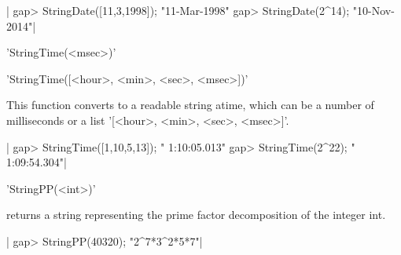 |   gap> StringDate([11,3,1998]);
   "11-Mar-1998"
   gap> StringDate(2^14);
   "10-Nov-2014"|

%

'StringTime(<msec>)'

'StringTime([<hour>, <min>, <sec>, <msec>])'

This function converts to a readable string atime,  which can be a number of
milliseconds or a list '[<hour>, <min>, <sec>, <msec>]'.

|   gap> StringTime([1,10,5,13]);
   " 1:10:05.013"
   gap> StringTime(2^22);
   " 1:09:54.304"|

%

'StringPP(<int>)'

returns a string representing the prime factor decomposition of the integer
int.

|   gap> StringPP(40320);
"2^7*3^2*5*7"|

